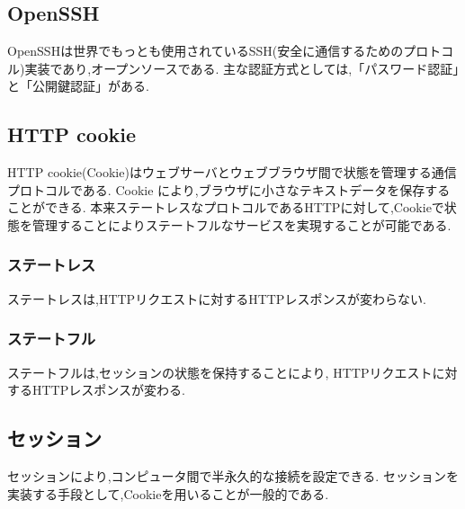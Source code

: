     \subsection{OpenSSH\cite{OpenSSH}}
    OpenSSHは世界でもっとも使用されているSSH(安全に通信するためのプロトコル)実装であり,オープンソースである.
    主な認証方式としては,「パスワード認証」と「公開鍵認証」がある.
    \subsection{HTTP cookie\cite{Cookie}}
        HTTP cookie(Cookie)はウェブサーバとウェブブラウザ間で状態を管理する通信プロトコルである.
        Cookie により,ブラウザに小さなテキストデータを保存することができる.
        本来ステートレスなプロトコルであるHTTPに対して,Cookieで状態を管理することによりステートフルなサービスを実現することが可能である.


        \subsubsection{ステートレス\cite{state}}
            ステートレスは,HTTPリクエストに対するHTTPレスポンスが変わらない.
        \subsubsection{ステートフル\cite{state}}
            ステートフルは,セッションの状態を保持することにより,
            HTTPリクエストに対するHTTPレスポンスが変わる.

    \subsection{セッション\cite{session}}
        セッションにより,コンピュータ間で半永久的な接続を設定できる.
        セッションを実装する手段として,Cookieを用いることが一般的である.
